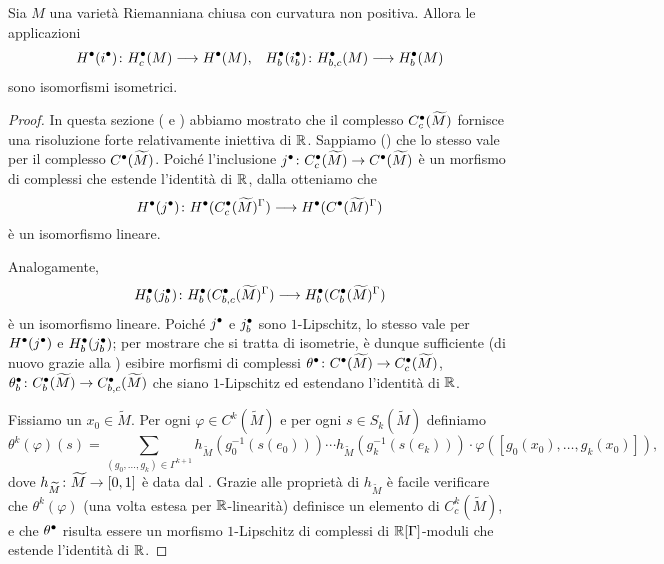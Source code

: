 \begin{proposition}
Sia $M$ una varietà Riemanniana chiusa con curvatura non positiva. Allora le applicazioni
\begin{align*}
\map{H^\bul(i^\bul)}{H^\bul_c(M)}{H^\bul(M)},&&\map{H^\bul_b(i^\bul_b)}{H^\bul_{b,c}(M)}{H^\bul_b(M)}
\end{align*}
sono isomorfismi isometrici. 
\end{proposition}
\begin{proof}
In questa sezione ( e ) abbiamo mostrato che il complesso $C^\bullet_c(\widetilde M)$ fornisce una risoluzione forte relativamente iniettiva di $\mathbb{R}$. Sappiamo () che lo stesso vale per il complesso $C^\bullet(\widetilde M)$. Poiché l'inclusione $\map{j^\bul}{C^\bul_c(\widetilde M)}{C^\bul(\widetilde M)}$ è un morfismo di complessi che estende l'identità di $\mathbb{R}$, dalla  otteniamo che 
\[
\map{H^\bul(j^\bul)}{H^\bul(C^\bul_c(\widetilde M)^\Gamma)}{H^\bul(C^\bul(\widetilde M)^\Gamma)}
\]
è un isomorfismo lineare.

Analogamente,
\[
\map{H^\bul_b(j^\bul_b)}{H^\bul_b(C^\bul_{b,c}(\widetilde M)^\Gamma)}{H^\bul_b(C^\bul_b(\widetilde M)^\Gamma)}
\]
è un isomorfismo lineare. Poiché $j^\bullet$ e $j^\bullet_b$ sono $1$-Lipschitz, lo stesso vale per $H^\bullet(j^\bullet)$ e $H^\bullet_b(j^\bullet_b)$; per mostrare che si tratta di isometrie, è dunque sufficiente (di nuovo grazie alla ) esibire morfismi di complessi $\map{\theta^\bul}{C^\bul(\widetilde M)}{C^\bul_c(\widetilde M)}$, $\map{\theta^\bul_b}{C^\bul_b(\widetilde M)}{C^\bul_{b,c}(\widetilde M)}$ che siano $1$-Lipschitz ed estendano l'identità di $\mathbb{R}$.

Fissiamo un $x_0\in\widetilde M$. Per ogni $\varphi\in C^k(\widetilde M)$ e per ogni $s\in S_k(\widetilde M)$ definiamo
\[
\theta^k(\varphi)(s)=\sum_{(g_0,\ldots,g_k)\in\Gamma^{k+1}}h_{\widetilde M}(g_0^{-1}(s(e_0)))\cdots h_{\widetilde M}(g_k^{-1}(s(e_k)))\cdot\varphi([g_0(x_0),\ldots,g_k(x_0)]),
\]
dove $\map{h_{\widetilde M}}{\widetilde M}{[0,1]}$ è data dal . Grazie alle proprietà di $h_{\widetilde M}$ è facile verificare che $\theta^k(\varphi)$ (una volta estesa per $\mathbb{R}$-linearità) definisce un elemento di $C^k_c(\widetilde M)$, e che $\theta^\bullet$ risulta essere un morfismo $1$-Lipschitz di complessi di $\mathbb{R}[\Gamma]$-moduli che estende l'identità di $\mathbb{R}$.


\end{proof}
